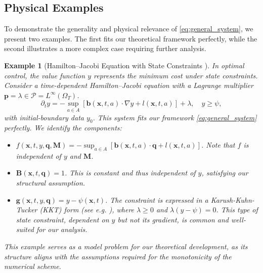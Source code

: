 \documentclass[pdflatex,sn-mathphys-num]{sn-jnl}%
\theoremstyle{thmstyleone}%
\newtheorem{ex}{Example}[section]
\numberwithin{equation}{section}
\begin{document}
\subsection{Physical Examples}\label{subsec:examples}

To demonstrate the generality and physical relevance of \eqref{eq:general_system}, we present two examples. The first fits our theoretical framework perfectly, while the second illustrates a more complex case requiring further analysis.

\begin{ex}[Hamilton--Jacobi Equation with State Constraints \cite{capuzzo1990hamilton}]
\label{ex:hamilton_jacobi}
In optimal control, the value function \( y \) represents the minimum cost under state constraints. Consider a time-dependent Hamilton--Jacobi equation with a Lagrange multiplier \( \bm{p} = \lambda \in \mathcal{P} = L^\infty(\Omega_T) \).
\[
\partial_t y = -\sup_{a \in A} \left[ \bm{b}(\bm{x}, t, a) \cdot \nabla y + l(\bm{x}, t, a) \right] + \lambda, \quad y \geq \psi,
\]
with initial-boundary data $y_0$. This system fits our framework \eqref{eq:general_system} perfectly. We identify the components:
\begin{itemize}
    \item $f(\bm{x}, t, y, \bm{q}, \bm{M}) = -\sup_{a \in A} \left[ \bm{b}(\bm{x}, t, a) \cdot \bm{q} + l(\bm{x}, t, a) \right]$. Note that $f$ is independent of $y$ and $\bm{M}$.
    \item $\bm{B}(\bm{x}, t, \bm{q}) = 1$. This is constant and thus independent of $y$, satisfying our structural assumption.
    \item $\bm{g}(\bm{x}, t, y, \bm{q}) = y - \psi(\bm{x}, t)$. The constraint is expressed in a Karush-Kuhn-Tucker (KKT) form (see e.g. \cite{bazaraa2006nonlinear}), where $\lambda \ge 0$ and $\lambda(y-\psi)=0$. This type of state constraint, dependent on $y$ but not its gradient, is common and well-suited for our analysis.
\end{itemize}
This example serves as a model problem for our theoretical development, as its structure aligns with the assumptions required for the monotonicity of the numerical scheme.
\end{ex}
\end{document}
